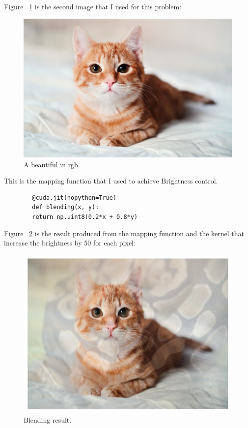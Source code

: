 \documentclass{article}
\begin{document}
	Figure ~\ref{fig:beautiful} is the second image that I used for this problem:
	
	\begin{figure}
		\includegraphics[width=\linewidth]{beautiful.jpg}
		\caption{A beautiful in rgb.}
		\label{fig:beautiful}
	\end{figure}
	
	This is the mapping function that I used to achieve Brightness control.
	
	\begin{verbatim}
		@cuda.jit(nopython=True)
		def blending(x, y):
		return np.uint8(0.2*x + 0.8*y)
	\end{verbatim}
	
	Figure ~\ref{fig:blending} is the result produced from the mapping function and the kernel that increase the brightness by 50 for each pixel:
	
	\begin{figure}
		\includegraphics[width=\linewidth]{blending.png}
		\caption{Blending result.}
		\label{fig:blending}
	\end{figure}
	
	
\end{document}

